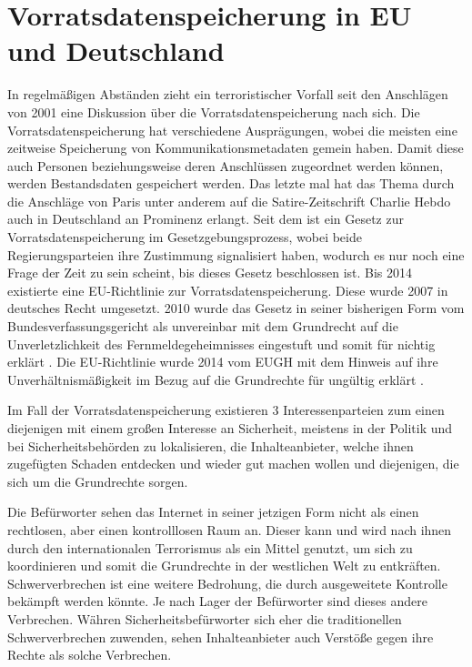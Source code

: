 \documentclass[
	12pt,
	a4paper,
	BCOR10mm,
	DIV14,
	listof=totoc,
	bibliography=totoc,
	headsepline
]{scrreprt}
\begin{document}

\section{Vorratsdatenspeicherung in EU und Deutschland}
\label{survailance}
In regelmäßigen Abständen zieht ein terroristischer Vorfall seit den Anschlägen von 2001 eine Diskussion über die Vorratsdatenspeicherung nach sich.
Die Vorratsdatenspeicherung hat verschiedene Ausprägungen, wobei die meisten eine zeitweise Speicherung von Kommunikationsmetadaten gemein haben.
Damit diese auch Personen beziehungsweise deren Anschlüssen zugeordnet werden können, werden Bestandsdaten gespeichert werden.
Das letzte mal hat das Thema durch die Anschläge von Paris unter anderem auf die Satire-Zeitschrift Charlie Hebdo auch in Deutschland an Prominenz erlangt.
Seit dem ist ein Gesetz zur Vorratsdatenspeicherung im Gesetzgebungsprozess, wobei beide Regierungsparteien ihre Zustimmung signalisiert haben, wodurch es nur noch eine Frage der Zeit zu sein scheint, bis dieses Gesetz beschlossen ist. 
Bis 2014 existierte eine EU-Richtlinie zur Vorratsdatenspeicherung.
Diese wurde 2007 in deutsches Recht umgesetzt.
2010 wurde das Gesetz in seiner bisherigen Form vom Bundesverfassungsgericht als unvereinbar mit dem Grundrecht auf die Unverletzlichkeit des Fernmeldegeheimnisses eingestuft und somit für nichtig erklärt \cite{bvg:no}.
Die EU-Richtlinie wurde 2014 vom EUGH mit dem Hinweis auf ihre Unverhältnismäßigkeit im Bezug auf die Grundrechte für ungültig erklärt \cite{eugh:no}. 

Im Fall der Vorratsdatenspeicherung existieren 3 Interessenparteien zum einen diejenigen mit einem großen Interesse an Sicherheit, meistens in der Politik und bei Sicherheitsbehörden zu lokalisieren, die Inhalteanbieter, welche ihnen zugefügten Schaden entdecken und wieder gut machen wollen und diejenigen, die sich um die Grundrechte sorgen.

Die Befürworter sehen das Internet in seiner jetzigen Form nicht als einen rechtlosen, aber einen kontrolllosen Raum an.
Dieser kann und wird nach ihnen durch den internationalen Terrorismus als ein Mittel genutzt, um sich zu koordinieren und somit die Grundrechte in der westlichen Welt zu entkräften.
Schwerverbrechen ist eine weitere Bedrohung, die durch ausgeweitete Kontrolle bekämpft werden könnte.
Je nach Lager der Befürworter sind dieses andere Verbrechen.
Währen Sicherheitsbefürworter sich eher die traditionellen Schwerverbrechen zuwenden, sehen Inhalteanbieter auch Verstöße gegen ihre Rechte als solche Verbrechen.
\end{document}

